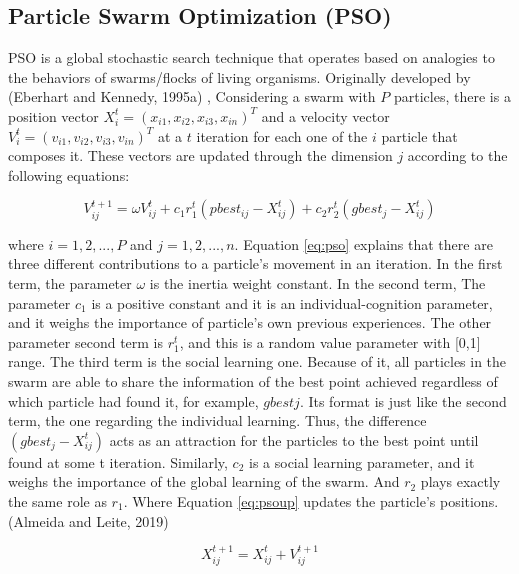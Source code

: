 \documentclass[]{elsarticle} %
\begin{document}
\hypertarget{particle-swarm-optimization-pso}{%
\subsection{Particle Swarm Optimization (PSO)}\label{particle-swarm-optimization-pso}}

PSO is a global stochastic search technique that operates based on analogies to the behaviors of swarms/flocks of living organisms. Originally developed by (Eberhart and Kennedy, 1995a) , Considering a swarm with \(P\) particles, there is a position vector \(X_{i}^{t}=(x_{i1},x_{i2}, x_{i3},x_{in})^T\) and a velocity vector \(V^t_i=(v_{i1},v_{i2},v_{i3},v_{in})^T\) at a \(t\) iteration for each one of the \(i\) particle that composes it. These vectors are updated through the dimension \(j\) according to the following equations:

\begin{equation}
V^{t+1}_{ij} = \omega V^{t}_{ij} + c_{1}r_{1}^{t}(pbest_{ij}-X_{ij}^t) + c_2r_2^t(gbest_j-X_{ij}^{t})
\label{eq:pso}
\end{equation}

where \(i=1,2,..., P\) and \(j =1,2,...,n\). Equation \eqref{eq:pso} explains that there are three different contributions to a particle's movement in an iteration. In the first term, the parameter \(\omega\) is the inertia weight constant. In the second term, The parameter \(c_1\) is a positive constant and it is an individual-cognition parameter, and it weighs the importance of particle's own previous experiences. The other parameter second term is \(r_1^t\), and this is a random value parameter with {[}0,1{]} range. The third term is the social learning one. Because of it, all particles in the swarm are able to share the information of the best point achieved regardless of which particle had found it, for example, \(gbestj\). Its format is just like the second term, the one regarding the individual learning. Thus, the difference \((gbest_j - X^t_{ij})\) acts as an attraction for the particles to the best point until found at some t iteration. Similarly, \(c_2\) is a social learning parameter, and it weighs the importance of the global learning of the swarm. And \(r_2\) plays exactly the same role as \(r_1\). Where Equation \eqref{eq:psoup} updates the particle's positions. (Almeida and Leite, 2019)

\begin{equation}
X_{ij}^{t+1} = X_{ij}^{t} + V_{ij}^{t+1}
\label{eq:psoup}
\end{equation}
\end{document}
